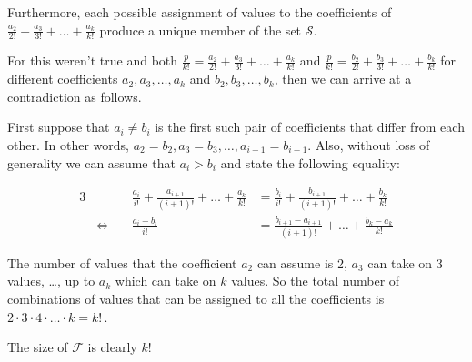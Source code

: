 \documentclass{article}
\begin{document}
Furthermore, each possible assignment of values to the coefficients of
\(\frac{a_2}{2!} + \frac{a_3}{3!} + \dots{} + \frac{a_k}{k!}\)
produce a unique member of the set \(\mathcal{S}\).

For this weren't true and both
\(\frac{p}{k!} = \frac{a_2}{2!} + \frac{a_3}{3!} + \dots{} + \frac{a_k}{k!}\) and
\(\frac{p}{k!} = \frac{b_2}{2!} + \frac{b_3}{3!} + \dots{} + \frac{b_k}{k!}\)
for different coefficients \(a_2, a_3, \dots{}, a_k\)
and \(b_2, b_3, \dots{}, b_k\), then we can arrive at a contradiction as follows.

First suppose that \(a_i\ne{}b_i\) is the first such pair of coefficients
that differ from each other. In other words, \(a_2=b_2, a_3=b_3, \dots{}, a_{i-1}=b_{i-1}\).
Also, without loss of generality we can assume that \(a_i > b_i\) and state the following equality:

{\normalsize
\bgroup
\setlength{\abovedisplayskip}{0pt}
\setlength{\belowdisplayskip}{0pt}
\begin{alignat*}{3}
  &&\frac{a_i}{i!} + \frac{a_{i+1}}{(i+1)!} + \dots{} + \frac{a_k}{k!}
  &= \frac{b_i}{i!} + \frac{b_{i+1}}{(i+1)!} + \dots{} + \frac{b_k}{k!}\\
  &\Leftrightarrow\quad &\frac{a_i - b_i}{i!}
  &= \frac{b_{i+1} - a_{i+1}}{(i+1)!} + \dots{} + \frac{b_k - a_k}{k!}
\end{alignat*}
\egroup
}%

The number of values that the coefficient \(a_2\) can assume is 2, \(a_3\) can take on 3 values, \dots{},
up to \(a_k\) which can take on \(k\) values. So the total number of combinations of values
that can be assigned to all the coefficients is \(2\cdot{}3\cdot{}4\cdot\dots{}\cdot{}k = k!\,\).



The size of \(\mathcal{F}\) is clearly \(k!\)
\end{document}
